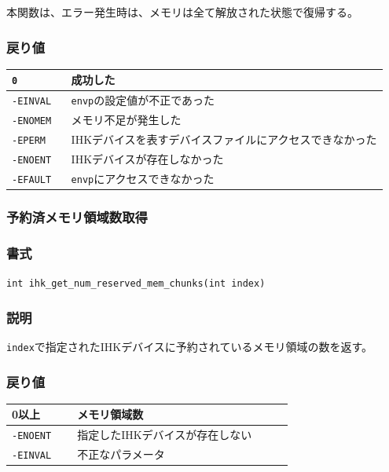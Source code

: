 \documentclass[twoside,11pt,fleqn]{book}
\begin{document}
本関数は、エラー発生時は、メモリは全て解放された状態で復帰する。

\subsubsection*{戻り値}
\begin{table}[!h]
\footnotesize
\begin{tabular}{|p{0.15\linewidth}|p{0.80\linewidth}|} \hline
\verb:0:&	成功した\\ \hline
\verb:-EINVAL:&	\verb:envp:の設定値が不正であった\\ \hline
\verb:-ENOMEM:&	メモリ不足が発生した\\ \hline
\verb:-EPERM:&	IHKデバイスを表すデバイスファイルにアクセスできなかった\\ \hline
\verb:-ENOENT:&	IHKデバイスが存在しなかった\\ \hline
\verb:-EFAULT:&	\texttt{envp}にアクセスできなかった\\ \hline
\end{tabular}
\vspace{-0em}
\end{table}
\FloatBarrier

\subsubsection{予約済メモリ領域数取得}
\subsubsection*{書式}{\quad} \texttt{int ihk\_get\_num\_reserved\_mem\_chunks(int index)}
\subsubsection*{説明}{\quad} \texttt{index}で指定されたIHKデバイスに予約されているメモリ領域の数を返す。

\subsubsection*{戻り値}{\quad}
\begin{table}[!h]
\footnotesize
\begin{tabular}{|p{0.20\linewidth}|p{0.66\linewidth}|} \hline
0以上&メモリ領域数\\ \hline
\texttt{-ENOENT}&指定したIHKデバイスが存在しない\\ \hline
\texttt{-EINVAL}&不正なパラメータ\\ \hline
\end{tabular}
\vspace{-0em}
\end{table}
\FloatBarrier
\end{document}
